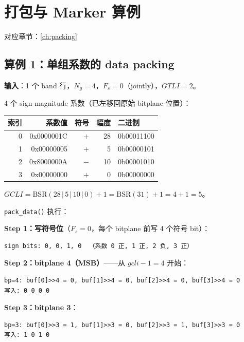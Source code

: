 
\section{打包与 Marker 算例}\label{sec:packing-examples}

对应章节：\cref{ch:packing}

\subsection{算例 1：单组系数的 data packing}

\begin{examplebox}[title={Packing Worked Example：单组系数的 data packing}]

\textbf{输入}：1 个 band 行，$N_g = 4$，$F_s = 0$（jointly），$\mathit{GTLI} = 2$。

4 个 sign-magnitude 系数（已左移回原始 bitplane 位置）：

\begin{tabular}{@{}rrrrl@{}}
\toprule
索引 & 系数值 & 符号 & 幅度 & 二进制 \\
\midrule
0 & 0x0000001C & $+$ & 28 & 0b00011100 \\
1 & 0x00000005 & $+$ & 5  & 0b00000101 \\
2 & 0x8000000A & $-$ & 10 & 0b00001010 \\
3 & 0x00000000 & $+$ & 0  & 0b00000000 \\
\bottomrule
\end{tabular}

$\mathit{GCLI} = \mathrm{BSR}(28\,|\,5\,|\,10\,|\,0) + 1 = \mathrm{BSR}(31) + 1 = 4 + 1 = 5$。

\texttt{pack\_data()} 执行：

\textbf{Step 1：写符号位}（$F_s=0$，每个 bitplane 前写 4 个符号 bit）：
\begin{lstlisting}[numbers=none]
sign bits: 0, 0, 1, 0  （系数 0 正, 1 正, 2 负, 3 正）
\end{lstlisting}

\textbf{Step 2：bitplane 4（MSB）}——从 $\mathit{gcli}-1 = 4$ 开始：
\begin{lstlisting}[numbers=none]
bp=4: buf[0]>>4 = 0, buf[1]>>4 = 0, buf[2]>>4 = 0, buf[3]>>4 = 0
写入: 0 0 0 0
\end{lstlisting}

\textbf{Step 3：bitplane 3}：
\begin{lstlisting}[numbers=none]
bp=3: buf[0]>>3 = 1, buf[1]>>3 = 0, buf[2]>>3 = 1, buf[3]>>3 = 0
写入: 1 0 1 0
\end{lstlisting}


\end{examplebox}
